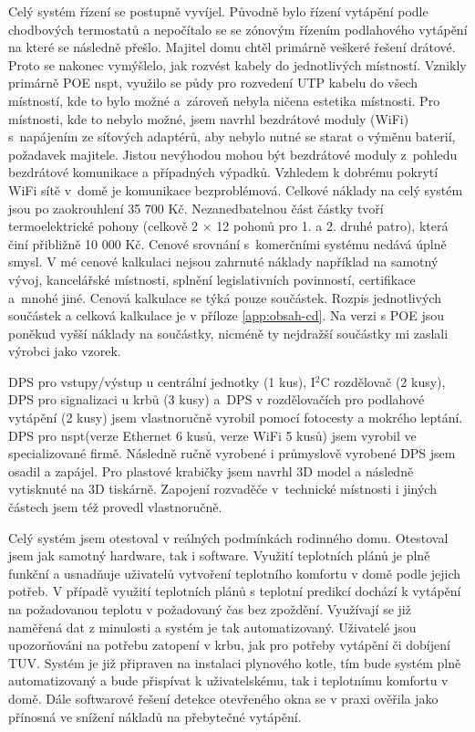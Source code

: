 Celý systém řízení se postupně vyvíjel. Původně bylo řízení vytápění podle chodbových termostatů a nepočítalo se se zónovým řízením podlahového vytápění na které se následně přešlo. Majitel domu chtěl primárně veškeré řešení drátové. Proto se nakonec vymýšlelo, jak rozvést kabely do jednotlivých místností. Vznikly primárně POE \acrshort{nspt}, využilo se půdy pro rozvedení UTP kabelu do všech místností, kde to bylo možné a~zároveň nebyla ničena estetika místnosti. Pro místnosti, kde to nebylo možné, jsem navrhl bezdrátové moduly (WiFi) s~napájením ze síťových adaptérů, aby nebylo nutné se starat o výměnu baterií, požadavek majitele. Jistou nevýhodou mohou být bezdrátové moduly z~pohledu bezdrátové komunikace a případných výpadků. Vzhledem k dobrému pokrytí WiFi sítě v~domě je komunikace bezproblémová. Celkové náklady na celý systém jsou po zaokrouhlení 35 700 Kč. Nezanedbatelnou část částky tvoří termoelektrické pohony (celkově 2 × 12 pohonů pro 1. a 2. druhé patro), která činí přibližně 10 000 Kč. Cenové srovnání s~komerčními systému nedává úplně smysl. V mé cenové kalkulaci nejsou zahrnuté náklady například na samotný vývoj, kancelářské místnosti, splnění legislativních povinností, certifikace a~mnohé jiné. Cenová kalkulace se týká pouze součástek. Rozpis jednotlivých součástek a celková kalkulace je v příloze \ref{app:obsah-cd}.  Na verzi s POE jsou poněkud vyšší náklady na součástky, nicméně ty nejdražší součástky mi zaslali výrobci jako vzorek.

DPS pro vstupy/výstup u centrální jednotky (1 kus), I$^{2}$C rozdělovač (2 kusy), DPS pro signalizaci u krbů (3 kusy) a~DPS v rozdělovačích pro podlahové vytápění (2 kusy) jsem vlastnoručně vyrobil pomocí fotocesty a mokrého leptání. DPS pro \acrshort{nspt}(verze Ethernet 6 kusů, verze WiFi 5 kusů) jsem vyrobil ve specializované firmě. Následně ručně vyrobené i průmyslově vyrobené DPS jsem osadil a zapájel. Pro plastové krabičky jsem navrhl 3D model a následně vytisknuté na 3D tiskárně. Zapojení rozvaděče v~technické místnosti i jiných částech jsem též provedl vlastnoručně.

Celý systém jsem otestoval v reálných podmínkách rodinného domu. Otestoval jsem jak samotný hardware, tak i software. Využití teplotních plánů je plně funkční a usnadňuje uživatelů vytvoření teplotního komfortu v domě podle jejich potřeb. V případě využití teplotních plánů s teplotní predikcí dochází k vytápění na požadovanou teplotu v požadovaný čas bez zpoždění. Využívají se již naměřená dat z minulosti a systém je tak automatizovaný. Uživatelé jsou upozorňováni na potřebu zatopení v krbu, jak pro potřeby vytápění či dobíjení TUV. Systém je již připraven na instalaci plynového kotle, tím bude systém plně automatizovaný a bude přispívat k uživatelskému, tak i teplotnímu komfortu v domě. Dále softwarové řešení detekce otevřeného okna se v praxi ověřila jako přínosná ve snížení nákladů na přebytečné vytápění.

